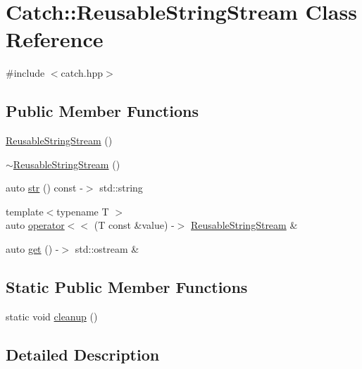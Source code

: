 \hypertarget{class_catch_1_1_reusable_string_stream}{}\section{Catch\+:\+:Reusable\+String\+Stream Class Reference}
\label{class_catch_1_1_reusable_string_stream}


{\ttfamily \#include $<$catch.\+hpp$>$}

\subsection*{Public Member Functions}
\begin{DoxyCompactItemize}
\item 
\mbox{\hyperlink{class_catch_1_1_reusable_string_stream_a9b3f8c52b0d2d63ffd825297a9c09781}{Reusable\+String\+Stream}} ()
\item 
\mbox{\hyperlink{class_catch_1_1_reusable_string_stream_aba9384e258a4db3178447b6a58414712}{$\sim$\+Reusable\+String\+Stream}} ()
\item 
auto \mbox{\hyperlink{class_catch_1_1_reusable_string_stream_a0e9ecf260b2a5d35f4886ef0d51f6270}{str}} () const -\/$>$ std\+::string
\item 
{\footnotesize template$<$typename T $>$ }\\auto \mbox{\hyperlink{class_catch_1_1_reusable_string_stream_af95f72024c082db70e5e50782e28e4f6}{operator$<$$<$}} (T const \&value) -\/$>$ \mbox{\hyperlink{class_catch_1_1_reusable_string_stream}{Reusable\+String\+Stream}} \&
\item 
auto \mbox{\hyperlink{class_catch_1_1_reusable_string_stream_a6881808c60a080d4e24a0b81c94cbf67}{get}} () -\/$>$ std\+::ostream \&
\end{DoxyCompactItemize}
\subsection*{Static Public Member Functions}
\begin{DoxyCompactItemize}
\item 
static void \mbox{\hyperlink{class_catch_1_1_reusable_string_stream_a4c320cf5ece009ed23c55b1fa9afccde}{cleanup}} ()
\end{DoxyCompactItemize}


\subsection{Detailed Description}


